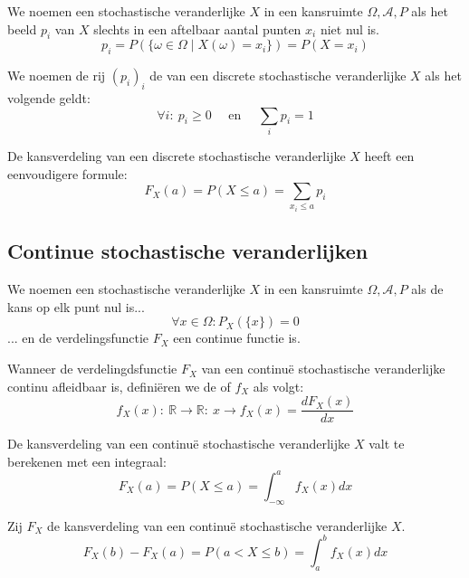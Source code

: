 \documentclass[main.tex]{subfiles}
\begin{document}
\begin{de}
  We noemen een stochastische veranderlijke $X$ in een kansruimte $\Omega,\mathcal{A},P$  als het beeld $p_{i}$ van $X$ slechts in een aftelbaar aantal punten $x_{i}$ niet nul is.
  \[ p_{i} = P(\{\omega \in \Omega \mid X(\omega) = x_{i}\}) = P(X = x_{i}) \]
\end{de}

\begin{de}
  We noemen de rij $(p_{i})_{i}$ de  van een discrete stochastische veranderlijke $X$ als het volgende geldt:
  \[ \forall i:\ p_{i} \ge 0 \quad\text{ en }\quad \sum_{i}p_{i} = 1 \]
\end{de}

\begin{st}
  De kansverdeling van een discrete stochastische veranderlijke $X$ heeft een eenvoudigere formule:
  \[ F_{X}(a) = P(X \le a) = \sum_{x_{i}\le a}p_{i} \]
\end{st}

\subsection{Continue stochastische veranderlijken}
\label{sec:cont-stoch-verand}

\begin{de}
  We noemen een stochastische veranderlijke $X$ in een kansruimte $\Omega,\mathcal{A},P$  als de kans op elk punt nul is...
  \[ \forall x\in \Omega: P_{X}(\{x\}) = 0 \]
  ... en de verdelingsfunctie $F_{X}$ een continue functie is.
\end{de}

\begin{de}
  Wanneer de verdelingdsfunctie $F_{X}$ van een continu\"e stochastische veranderlijke continu afleidbaar is, defini\"eren we de  of  $f_{X}$ als volgt:
  \[ f_{X}(x):\ \mathbb{R} \rightarrow \mathbb{R}:\ x \rightarrow f_{X}(x) = \frac{dF_{X}(x)}{dx} \]
\end{de}

\begin{st}
  De kansverdeling van een continu\"e stochastische veranderlijke $X$ valt te berekenen met een integraal:
  \[ F_{X}(a) = P(X \le a) = \int_{-\infty}^{a}f_{X}(x)dx \]
\end{st}

\begin{st}
  Zij $F_{X}$ de kansverdeling van een continu\"e stochastische veranderlijke $X$.
  \[ F_{X}(b) - F_{X}(a) = P(a<X\le b) = \int_{a}^{b}f_{X}(x)dx \]
\end{st}
\end{document}
